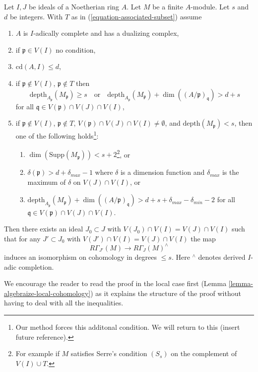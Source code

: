 \begin{lemma}
\label{lemma-algebraize-local-cohomology-general}
Let $I, J$ be ideals of a Noetherian ring $A$.
Let $M$ be a finite $A$-module.
Let $s$ and $d$ be integers. With $T$ as in
(\ref{equation-associated-subset}) assume
\begin{enumerate}
\item $A$ is $I$-adically complete and has a dualizing complex,
\item if $\mathfrak p \in V(I)$ no condition,
\item $\text{cd}(A, I) \leq d$,
\item if $\mathfrak p \not \in V(I)$, $\mathfrak p \not \in T$ then
$$
\text{depth}_{A_\mathfrak p}(M_\mathfrak p) \geq s
\quad\text{or}\quad
\text{depth}_{A_\mathfrak p}(M_\mathfrak p) +
\dim((A/\mathfrak p)_\mathfrak q) > d + s
$$
for all $\mathfrak q \in V(\mathfrak p) \cap V(J) \cap V(I)$,
\item if $\mathfrak p \not \in V(I)$, $\mathfrak p \not \in T$,
$V(\mathfrak p) \cap V(J) \cap V(I) \not = \emptyset$, and
$\text{depth}(M_\mathfrak p) < s$, then one
of the following holds\footnote{Our method
forces this additonal condition. We will return to this
(insert future reference).}:
\begin{enumerate}
\item $\dim(\text{Supp}(M_\mathfrak p)) < s + 2$\footnote{For example
if $M$ satisfies Serre's condition $(S_s)$
on the complement of $V(I) \cup T$.}, or
\item  $\delta(\mathfrak p) > d + \delta_{max} - 1$
where $\delta$ is a dimension function and $\delta_{max}$
is the maximum of $\delta$ on $V(J) \cap V(I)$, or
\item $\text{depth}_{A_\mathfrak p}(M_\mathfrak p) +
\dim((A/\mathfrak p)_\mathfrak q) > d + s + \delta_{max} - \delta_{min} - 2$
for all $\mathfrak q \in V(\mathfrak p) \cap V(J) \cap V(I)$.
\end{enumerate}
\end{enumerate}
Then there exists an ideal $J_0 \subset J$ with
$V(J_0) \cap V(I) = V(J) \cap V(I)$
such that for any $J' \subset J_0$ with
$V(J') \cap V(I) = V(J) \cap V(I)$ the map
$$
R\Gamma_{J'}(M) \longrightarrow R\Gamma_J(M)^\wedge
$$
induces an isomorphism on cohomology in degrees $\leq s$.
Here ${}^\wedge$ denotes derived $I$-adic completion.
\end{lemma}

\noindent
We encourage the reader to read the proof in the local case first
(Lemma \ref{lemma-algebraize-local-cohomology}) as it explains the structure
of the proof without having to deal with all the inequalities.


